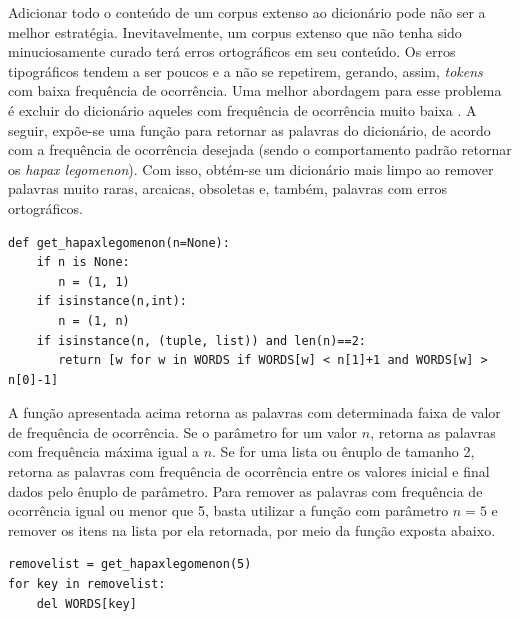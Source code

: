 \documentclass{textolivre}
\begin{document}
Adicionar todo o conteúdo de um corpus extenso ao dicionário pode não ser a melhor estratégia. 
Inevitavelmente, um
corpus extenso que não tenha sido minuciosamente curado terá erros ortográficos
em seu conteúdo. Os erros tipográficos tendem a ser poucos e a não se
repetirem, gerando, assim,
\textit{tokens}
com baixa frequência de ocorrência. Uma melhor abordagem para esse problema é
excluir do
dicionário aqueles com frequência de ocorrência muito baixa \cite{peterson80}. 
A seguir,  expõe-se uma função para
retornar as palavras do dicionário, de acordo com a frequência de ocorrência
desejada (sendo o comportamento padrão retornar os \textit{hapax legomenon}).
Com isso, obtém-se um dicionário mais
limpo ao remover palavras muito raras, arcaicas, obsoletas e, também,
palavras com erros ortográficos. 
\begin{lstlisting}[label=lst-hapax]
def get_hapaxlegomenon(n=None):
    if n is None:
       n = (1, 1)
    if isinstance(n,int):
       n = (1, n)
    if isinstance(n, (tuple, list)) and len(n)==2:
       return [w for w in WORDS if WORDS[w] < n[1]+1 and WORDS[w] > n[0]-1]
\end{lstlisting}
A função apresentada acima retorna as
palavras com determinada faixa de valor de frequência de ocorrência.
Se o parâmetro for um valor $n$, retorna
as palavras com frequência máxima igual a $n$.
Se for uma lista ou ênuplo de tamanho 2,
retorna as palavras com frequência de ocorrência entre os valores inicial e final dados pelo ênuplo de parâmetro.
Para remover as palavras com frequência de ocorrência igual ou menor que 5, basta utilizar a função
com parâmetro $n=5$ e remover os itens na lista por ela retornada, por meio da
função exposta abaixo.
\begin{lstlisting}[label=lst-rm-lfreq]
removelist = get_hapaxlegomenon(5)
for key in removelist:
    del WORDS[key]
\end{lstlisting}%
\end{document}
